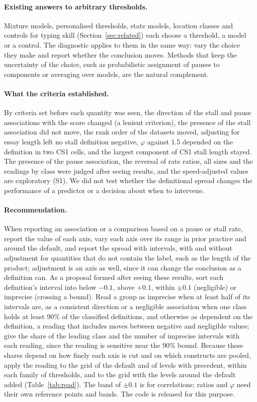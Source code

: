 \paragraph{Existing answers to arbitrary thresholds.} Mixture models, personalised thresholds, state models, location
classes and controls for typing skill (Section~\ref{sec:related}) each choose a threshold, a model or a control. The
diagnostic applies to them in the same way: vary the choice they make and report whether the conclusion moves. Methods
that keep the uncertainty of the choice, such as probabilistic assignment of pauses to components or averaging over
models, are the natural complement.

\paragraph{What the criteria established.} By criteria set before each quantity was seen, the direction of the stall
and pause associations with the score changed (a lenient criterion), the presence of the stall association did not
move, the rank order of the datasets moved, adjusting for essay length left no stall definition negative, $\varphi$
against 1.5 depended on the definition in two CS1 cells, and the largest component of CS1 stall length stayed. The presence of the pause association, the
reversal of rate ratios, all sizes and the readings by class were judged after seeing results, and the speed-adjusted
values are exploratory (S1). We did not test whether the definitional spread changes the performance of a predictor
or a decision about when to intervene.

\paragraph{Recommendation.} When reporting an association or a comparison based on a pause or stall rate, report the
value of each axis, vary each axis over its range in prior practice and around the default, and report the spread with
intervals, with and without adjustment for quantities that do not contain the label, such as the length of the
product; adjustment is an axis as well, since it can change the conclusion as a definition can. As a proposal formed
after seeing these results, sort each definition's interval into below $-0.1$, above $+0.1$, within $\pm 0.1$
(negligible) or imprecise (crossing a bound). Read a group as imprecise when at least half of its intervals are, as a
consistent direction or a negligible association when one class holds at least 90\% of the classified definitions, and
otherwise as dependent on the definition, a reading that includes moves between negative and negligible values; give
the share of the leading class and the number of imprecise intervals with each reading, since the reading is sensitive
near the 90\% bound. Because these shares depend on how finely each axis is cut and on which constructs are pooled,
apply the reading to the grid of the default and of levels with precedent, within each family of thresholds, and to the
grid with the levels around the default added (Table~\ref{tab:read}). The band of $\pm 0.1$ is for correlations;
ratios and $\varphi$ need their own reference points and bands. The code is released for this purpose.
